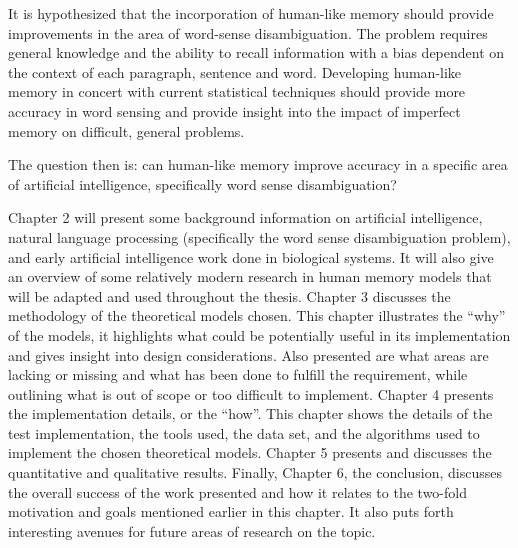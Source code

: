 It is hypothesized that the incorporation of human-like memory should provide
improvements in the area of word-sense disambiguation. The problem requires
general knowledge and the ability to recall information with a bias dependent on
the context of each paragraph, sentence and word.  Developing human-like memory
in concert with current statistical techniques should provide more accuracy in
word sensing and provide insight into the impact of imperfect memory on
difficult, general problems.

The question then is: can human-like memory improve accuracy in a specific area
of artificial intelligence, specifically word sense disambiguation?

Chapter 2 will present some background information on artificial intelligence,
natural language processing (specifically the word sense disambiguation
problem), and early artificial intelligence work done in biological systems. It
will also give an overview of some relatively modern research in human memory models
that will be adapted and used throughout the thesis.  Chapter 3 discusses the
methodology of the theoretical models chosen. This chapter illustrates the
``why'' of the models, it highlights what could be potentially useful in its
implementation and gives insight into design considerations.  Also presented are
what areas are lacking or missing and what has been done to fulfill the
requirement, while outlining what is out of scope or too difficult to implement.
Chapter 4 presents the implementation details, or the ``how''.  This chapter
shows the details of the test implementation, the tools used, the data set, and
the algorithms used to implement the chosen theoretical models.  Chapter 5
presents and discusses the quantitative and qualitative results. Finally,
Chapter 6, the conclusion, discusses the overall success of the work presented and
how it relates to the two-fold motivation and goals mentioned earlier in this
chapter. It also puts forth interesting avenues for future areas of research on
the topic.
